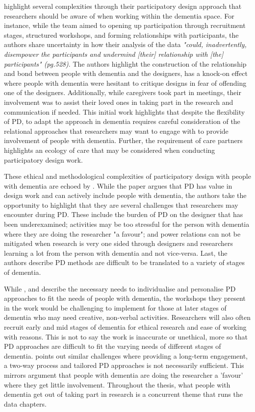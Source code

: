 \cite{lindsay_empathy_2012} highlight several complexities through their participatory design approach that researchers should be aware of when working within the dementia space. For instance, while the team aimed to opening up participation through recruitment stages, structured workshops, and forming relationships with participants, the authors share uncertainty in how their analysis of the data \textit{"could, inadvertently, disempower the participants and undermind [their] relationship with [the] participants" (pg.528)}. The authors highlight the construction of the relationship and bond between people with dementia and the designers, has a knock-on effect where people with dementia were hesitant to critique designs in fear of offending one of the designers. Additionally, while caregivers took part in meetings, their involvement was to assist their loved ones in taking part in the research and communication if needed. This initial work highlights that despite the flexibility of PD, to adapt the approach in dementia requires careful consideration of the relational approaches that researchers may want to engage with to provide involvement of people with dementia. Further, the requirement of care partners highlights an ecology of care that may be considered when conducting participatory design work. 

These ethical and methodological complexities of participatory design with people with dementia are echoed by \cite{hendriks_challenges_2014}. While the paper argues that PD has value in design work and can actively include people with dementia, the authors take the opportunity to highlight that they are several challenges that researchers may encounter during PD. These include the burden of PD on the designer that has been underexamined; activities may be too stressful for the person with dementia where they are doing the researcher "a favour"; and power relations can not be mitigated when research is very one sided through designers and researchers learning a lot from the person with dementia and not vice-versa. Last, the authors describe PD methods are difficult to be translated to a variety of stages of dementia. 

While \cite{lindsay_empathy_2012} , and \cite{stenhouse2013dangling} describe the necessary needs to individualise and personalise PD approaches to fit the needs of people with dementia, the workshops they present in the work would be challenging to implement for those at later stages of dementia who may need creative, non-verbal activities. Researchers will also often recruit early and mid stages of dementia for ethical research and ease of working with reasons. This is not to say the work is inaccurate or unethical, more so that PD approaches are difficult to fit the varying needs of different stages of dementia. \cite{bossen2012impediments} points out similar challenges where providing a long-term engagement, a two-way process and tailored PD approaches is not necessarily sufficient. This mirrors \cite{hendriks_challenges_2014} argument that people with dementia are doing the researcher a 'favour' where they get little involvement. Throughout the thesis, what people with dementia get out of taking part in research is a concurrent theme that runs the data chapters.

